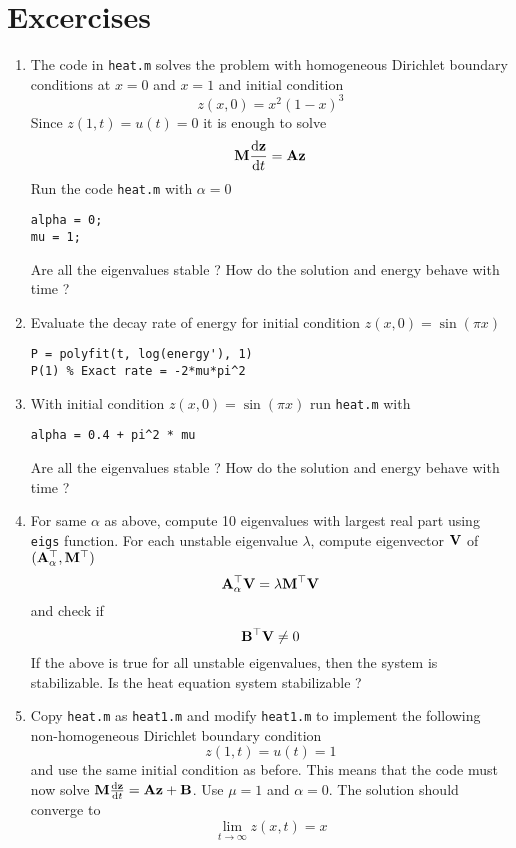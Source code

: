 \documentclass[12pt]{article}
\begin{document}
\section{Excercises}
\begin{enumerate}
\item The code in {\tt heat.m} solves the problem with homogeneous Dirichlet boundary conditions at $x=0$ and $x=1$ and initial condition
\[
z(x,0) = x^2 (1-x)^3
\]
Since $z(1,t) = u(t) = 0$ it is enough to solve
\[
{\mathbf M} \frac{\textrm{d} {\mathbf z}}{\textrm{d} t} = {\mathbf A} {\mathbf z}
\]
Run the code {\tt heat.m} with $\alpha =0$
\begin{lstlisting}
alpha = 0; 
mu = 1;
\end{lstlisting}
Are all the eigenvalues stable ? How do the solution and energy behave with time ?

\item Evaluate the decay rate of energy for initial condition $z(x,0) = \sin(\pi x)$
\begin{lstlisting}
P = polyfit(t, log(energy'), 1)
P(1) % Exact rate = -2*mu*pi^2
\end{lstlisting}
      
\item With initial condition $z(x,0) = \sin(\pi x)$ run {\tt heat.m} with
\begin{lstlisting}
alpha = 0.4 + pi^2 * mu
\end{lstlisting}
Are all the eigenvalues stable ? How do the solution and energy behave with time ?

\item For same $\alpha$ as above, compute 10 eigenvalues with largest real part using {\tt eigs} function. For each unstable eigenvalue $\lambda$, compute eigenvector ${\mathbf V}$ of $({\mathbf A}_\alpha^\top,{\mathbf M}^\top)$
\[
 {\mathbf A}_\alpha^\top {\mathbf V} = \lambda {\mathbf M}^\top {\mathbf V}
\]
and check if 
\[
 {\mathbf B}^\top {\mathbf V} \ne 0
\]
If the above is true for all unstable eigenvalues, then the system is stabilizable. Is the heat equation system stabilizable ?

\item Copy {\tt heat.m} as {\tt heat1.m} and modify {\tt heat1.m} to implement the following non-homogeneous Dirichlet boundary condition
\[
z(1,t) = u(t) = 1
\]
and use the same initial condition as before. This means that the code must now solve ${\mathbf M} \frac{\textrm{d} {\mathbf z}}{\textrm{d} t}={\mathbf A} {\mathbf z} + {\mathbf B}$. Use $\mu=1$ and $\alpha=0$. The solution should converge to
\[
\lim_{t \to \infty} z(x,t) = x
\]

\end{enumerate}

\end{document}
